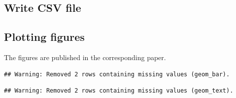 \documentclass[
]{article}
\begin{document}
\hypertarget{write-csv-file}{%
\subsection*{Write CSV file}\label{write-csv-file}}

\hypertarget{plotting-figures}{%
\subsection*{Plotting figures}\label{plotting-figures}}

The figures are published in the corresponding paper.

\begin{verbatim}
## Warning: Removed 2 rows containing missing values (geom_bar).
\end{verbatim}

\begin{verbatim}
## Warning: Removed 2 rows containing missing values (geom_text).
\end{verbatim}
\end{document}
